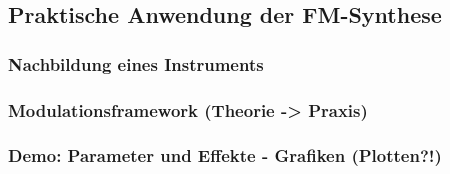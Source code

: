 \subsection{Praktische Anwendung der FM-Synthese}

\subsubsection{Nachbildung eines Instruments}
\subsubsection{Modulationsframework (Theorie -> Praxis)}
\subsubsection{Demo: Parameter und Effekte - Grafiken (Plotten?!)}